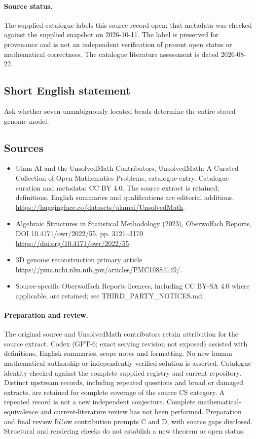 \documentclass[11pt]{article}
\begin{document}
\paragraph{Source status.}
The supplied catalogue labels this source record open; that metadata was checked against the supplied snapshot on 2026-10-11. The label is preserved for provenance and is not an independent verification of present open status or mathematical correctness. The catalogue literature assessment is dated 2026-08-22.
\subsection{Short English statement}
Ask whether seven unambiguously located beads determine the entire stated genome model.
\subsection{Sources}
\begin{itemize}
\item[S1] Ulam AI and the UnsolvedMath Contributors, UnsolvedMath: A Curated Collection of Open Mathematics Problems, catalogue entry. Catalogue curation and metadata: CC BY 4.0. The source extract is retained; definitions, English summaries and qualifications are editorial additions.
\url{https://huggingface.co/datasets/ulamai/UnsolvedMath}.
\item[S2] Algebraic Structures in Statistical Methodology (2023), Oberwolfach Reports, DOI 10.4171/owr/2022/55, pp. 3121--3170
\url{https://doi.org/10.4171/owr/2022/55}.
\item[S3] 3D genome reconstruction primary article
\url{https://pmc.ncbi.nlm.nih.gov/articles/PMC10884149/}.
\item Source-specific Oberwolfach Reports licences, including CC BY-SA 4.0 where applicable, are retained; see THIRD\_PARTY\_NOTICES.md.
\end{itemize}
\paragraph{Preparation and review.}
The original source and UnsolvedMath contributors retain attribution for the source extract. Codex (GPT-6; exact serving revision not exposed) assisted with definitions, English summaries, scope notes and formatting. No new human mathematical authorship or independently verified solution is asserted. Catalogue identity checked against the complete supplied registry and current repository. Distinct upstream records, including repeated questions and broad or damaged extracts, are retained for complete coverage of the source CS category. A repeated record is not a new independent conjecture. Complete mathematical-equivalence and current-literature review has not been performed. Preparation and final review follow contribution prompts C and D, with source gaps disclosed. Structural and rendering checks do not establish a new theorem or open status.
\label{end:statement}
\end{document}
